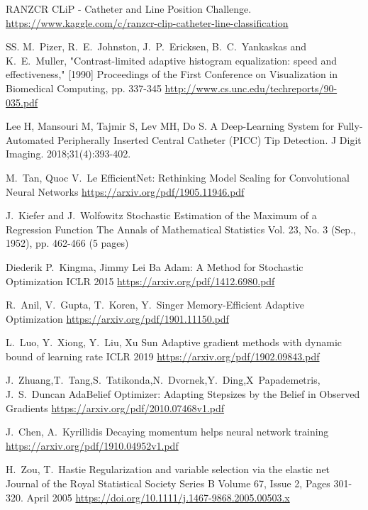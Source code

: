 \documentclass[journal, a4paper]{IEEEtran}
\begin{document}
\clearpage
\begin{thebibliography}{5}
	RANZCR CLiP - Catheter and Line Position Challenge. 
	\url{https://www.kaggle.com/c/ranzcr-clip-catheter-line-classification}
				
	SS. M.~Pizer, R.~E.~Johnston, J.~P.~Ericksen, B.~C.~Yankaskas and K.~E.~Muller, "Contrast-limited adaptive histogram equalization: speed and effectiveness," [1990] Proceedings of the First Conference on Visualization in Biomedical Computing, pp. 337-345
	\url{http://www.cs.unc.edu/techreports/90-035.pdf}
			    
	Lee H, Mansouri M, Tajmir S, Lev MH, Do S. A Deep-Learning System for Fully-Automated Peripherally Inserted Central Catheter (PICC) Tip Detection. J Digit Imaging. 2018;31(4):393-402.
			
	M.~Tan, Quoc V.~Le 
	EfficientNet: Rethinking Model Scaling for Convolutional Neural Networks
	\url{https://arxiv.org/pdf/1905.11946.pdf}
				
	J.~Kiefer and J.~Wolfowitz
	Stochastic Estimation of the Maximum of a Regression Function
	The Annals of Mathematical Statistics
	Vol. 23, No. 3 (Sep., 1952), pp. 462-466 (5 pages)
			
	Diederik P.~Kingma,     Jimmy Lei Ba
	Adam: A Method for Stochastic Optimization
	ICLR 2015
	\url{https://arxiv.org/pdf/1412.6980.pdf}
			    
	R.~Anil, V.~Gupta, T.~Koren, Y.~Singer
	Memory-Efficient Adaptive Optimization
	\url{https://arxiv.org/pdf/1901.11150.pdf}
			    
			    
	L.~Luo, Y.~Xiong, Y.~Liu, Xu Sun
	Adaptive gradient methods with dynamic bound of learning rate
	ICLR 2019
	\url{https://arxiv.org/pdf/1902.09843.pdf}
			    
			    
	J.~Zhuang,T.~Tang,S.~Tatikonda,N.~Dvornek,Y.~Ding,X~Papademetris, J.~S.~Duncan
	AdaBelief Optimizer: Adapting Stepsizes by the Belief in Observed Gradients
	\url{https://arxiv.org/pdf/2010.07468v1.pdf}
			    
			    
	J.~Chen, A.~Kyrillidis
	Decaying momentum helps neural network training
	\url{https://arxiv.org/pdf/1910.04952v1.pdf}
			    
			    
	H.~Zou, T.~Hastie
	Regularization and variable selection via the elastic net
	Journal of the Royal Statistical Society Series B
	Volume 67, Issue 2, Pages 301-320. April 2005
	\url{ https://doi.org/10.1111/j.1467-9868.2005.00503.x}
			    

\end{thebibliography}
\end{document}
